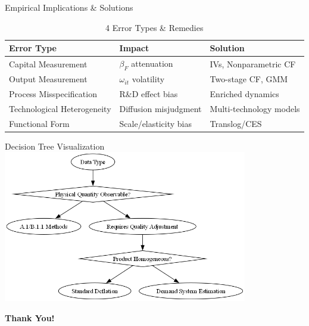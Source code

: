 \documentclass[aspectratio=169]{beamer}  %
\begin{document}
\begin{frame}{Empirical Implications \& Solutions}
\begin{table}[ht]
\centering
\caption{4 Error Types \& Remedies}
\begin{tabular}{p{3cm}p{4cm}p{4cm}}
\toprule
\textbf{Error Type} & \textbf{Impact} & \textbf{Solution} \\
\midrule
Capital Measurement & \(\beta_F\) attenuation & IVs, Nonparametric CF \\
Output Measurement & \(\omega_{it}\) volatility & Two-stage CF, GMM \\
Process Misspecification & R\&D effect bias & Enriched dynamics \\
Technological Heterogeneity & Diffusion misjudgment & Multi-technology models \\
Functional Form & Scale/elasticity bias & Translog/CES \\
\bottomrule
\end{tabular}
\end{table}
\end{frame}



\begin{frame}{Decision Tree Visualization}
\hypertarget{imagepage}{} 
\centering
\includegraphics[width=0.8\textwidth]{Figure/decision_tree.png}

\vspace{1em}
\hyperlink{mainpage}{}
\end{frame}


\begin{frame}[plain]
    \centering
    \vspace{2cm}
    {\Huge \textbf{Thank You!}}
\end{frame}
\end{document}
